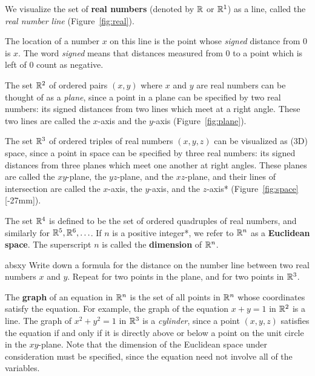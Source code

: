 \documentclass{watsonbook}
\begin{document}
We visualize the set of \textbf{real numbers} (denoted by $\mathbb{R}$ or
$\mathbb{R}^1$) as a line, called the \textit{real number line}
(Figure~\ref{fig:real}).

The location of a number $x$ on this line is the point whose
\textit{signed} distance from 0 is $x$. The word \textit{signed} means
that distances measured from 0 to a point which is left of 0 count as
negative.

The set $\mathbb{R}^2$ of ordered pairs $(x,y)$ where $x$ and $y$ are real
numbers can be thought of as a \textit{plane}, since a point in a
plane can be specified by two real numbers: its signed distances from
two lines which meet at a right angle. These two lines are called the
$x$-axis and the $y$-axis (Figure~\ref{fig:plane}). 

The set $\mathbb{R}^3$ of ordered triples of real numbers $(x,y,z)$ can be
visualized as (3D) space, since a point in space can be specified by
three real numbers: its signed distances from three planes which meet
one another at right angles. These planes are called the $xy$-plane,
the $yz$-plane, and the $xz$-plane, and their lines of intersection
are called the $x$-axis, the $y$-axis, and the $z$-axis*
(Figure~\ref{fig:space}[-27mm]).

The set $\mathbb{R}^4$ is defined to be the set of ordered quadruples of real
numbers, and similarly for $\mathbb{R}^5, \mathbb{R}^6, \ldots$.  
 If
$n$ is a positive integer*, we refer to $\mathbb{R}^n$ as a \textbf{Euclidean
  space}. The superscript $n$
is called the \textbf{dimension} of $\mathbb{R}^n$.

\begin{exercise}[parbox=true]{}{absxy}
  Write down a formula for the distance on the number line between two 
  real numbers $x$ and $y$. Repeat for two points in the plane, and
  for two points in $\mathbb{R}^3$. 
\end{exercise}

\bang{4mm}
The \textbf{graph} of an equation in $\mathbb{R}^n$ is the set of all points
in $\mathbb{R}^n$ whose coordinates satisfy the equation. For example, the
graph of the equation $x + y = 1$ in $\mathbb{R}^2$ is a line. The graph of
$x^2 + y^2 = 1$ in $\mathbb{R}^3$ is a \textit{cylinder}, since a point
$(x,y,z)$ satisfies the equation if and only if it is directly above
or below a point on the unit circle in the $xy$-plane. Note that the
dimension of the Euclidean space under consideration must be
specified, since the equation need not involve all of the variables.
\end{document}

